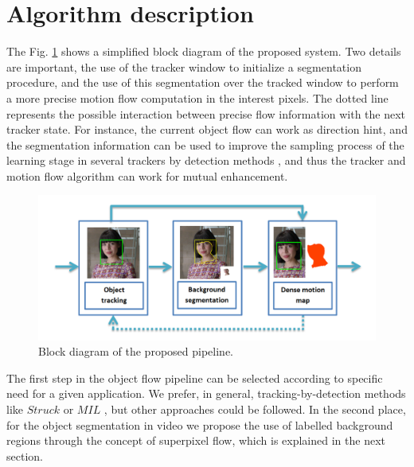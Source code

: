\section{Algorithm description}
\label{sec:desc}

The Fig. \ref{figurelabel_sys} shows a simplified block diagram of the proposed system. Two details are important, 
the use of the tracker window to initialize a segmentation procedure, and the use of this segmentation over the tracked window 
to perform a more precise motion flow computation in the interest pixels. The dotted line represents the possible interaction 
between precise flow information with the next tracker state. For instance, the current object flow can work as direction hint, and 
the segmentation information can be used to improve the sampling process of the learning stage in several trackers by detection methods \cite{c22}, and 
thus the tracker and motion flow algorithm can work for mutual enhancement.

   \begin{figure}[thpb]
      \centering
      \includegraphics[width=1.00\textwidth]{../images/system.png}
      \caption{Block diagram of the proposed pipeline.}
      \label{figurelabel_sys}
   \end{figure}

The first step in the object flow pipeline can be selected according to specific need for a given application. We prefer, in general, tracking-by-detection methods 
like $Struck$ \cite{c22} or $MIL$ \cite{c23}, but other approaches could be followed. In the second place, for the object segmentation in video we propose the use 
of labelled background regions through the concept of superpixel flow, which is explained in the next section.

